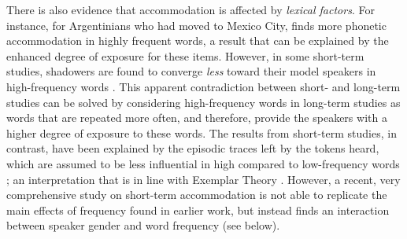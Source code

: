 \documentclass[output=paper,
modfonts
]{langscibook}
\begin{document}
% 
% 
%
% 
%
% 
% 
% 
%
% 
%

There is also evidence that accommodation is affected by \textit{lexical factors}. For instance, for Argentinians who had moved to Mexico City, \citet{pesqueira_cambio_2008} finds more phonetic accommodation in highly frequent words, a result that can be explained by the enhanced degree of exposure for these items. However, in some short-term studies, shadowers are found to converge \textit{less} toward their model speakers in high-frequency words \cite{goldinger_echoes_1998,goldinger_episodic_2004,babel_dialect_2010,nielsen_specificity_2011}. This apparent contradiction between short- and long-term studies can be solved by considering high-frequency words in long-term studies as words that are repeated more often, and therefore, provide the speakers with a higher degree of exposure to these words. The results from short-term studies, in contrast, have been explained by the episodic traces left by the tokens heard, which are assumed to be less influential in high compared to low-frequency words \cite{goldinger_echoes_1998}; an interpretation that is in line with Exemplar Theory \citep{pierrehumbert_exemplar_2001}. However, a recent, very comprehensive study on short-term accommodation \citep{pardo_phonetic_2017} is not able to replicate the main effects of frequency found in earlier work, but instead finds an interaction between speaker gender and word frequency (see below). 
% 
% 
\end{document}
